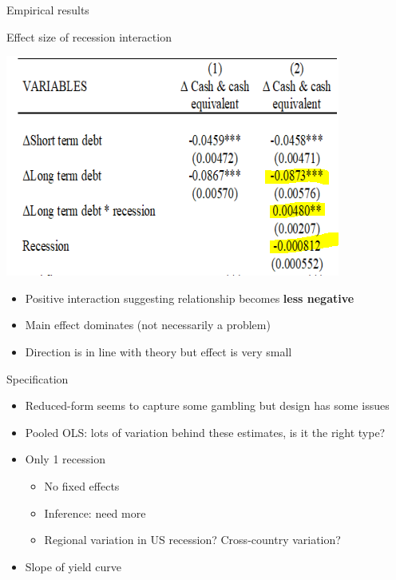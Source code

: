 \documentclass[ignorenonframetext,aspectratio=169]{beamer}
\providecommand{\tightlist}{%
  \setlength{\itemsep}{0pt}\setlength{\parskip}{0pt}}
\begin{document}
\begin{frame}{Empirical results}

Effect size of recession interaction

\begin{minipage}[c]{0.48\linewidth}
\includegraphics[width=0.8\linewidth]{interact}
\end{minipage}\begin{minipage}[c]{0.48\linewidth}
\begin{itemize}
\item Positive interaction suggesting relationship becomes {\bf less negative}
\item Main effect dominates (not necessarily a problem)
\item Direction is in line with theory but effect is very small \end{itemize}\end{minipage}

\end{frame}

\begin{frame}{Specification}

\begin{itemize}
\item
  Reduced-form seems to capture some gambling but design has some issues
\item
  Pooled OLS: lots of variation behind these estimates, is it the right
  type?
\item
  Only 1 recession

  \begin{itemize}
  \tightlist
  \item
    No fixed effects
  \item
    Inference: need more
  \item
    Regional variation in US recession? Cross-country variation?
  \end{itemize}
\item
  Slope of yield curve
\end{itemize}

\end{frame}
\end{document}
